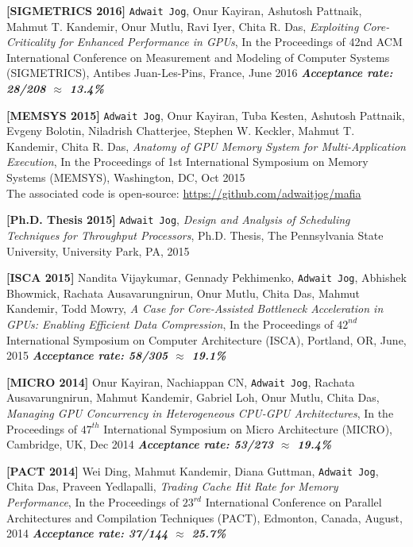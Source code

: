 \documentclass[10pt,a4]{article}
\begin{document}
\begin{description}
\item{\bf [SIGMETRICS 2016]} 
{\tt Adwait Jog}, Onur Kayiran, Ashutosh Pattnaik, Mahmut T. Kandemir, 
Onur Mutlu, Ravi Iyer, Chita R. Das, {\it Exploiting Core-Criticality for Enhanced Performance in GPUs}, 
In the Proceedings of 42nd ACM International Conference on Measurement and Modeling of Computer Systems (SIGMETRICS), Antibes Juan-Les-Pins, France, June 2016 
\textbf{\textit{Acceptance rate: 28/208 $\approx$ 13.4\%}}

\item 
{\bf [MEMSYS 2015]}
{\tt Adwait Jog}, Onur Kayiran, Tuba Kesten, Ashutosh Pattnaik, Evgeny Bolotin, Niladrish Chatterjee, 
Stephen W. Keckler, Mahmut T. Kandemir, Chita R. Das, 
{\it Anatomy of GPU Memory System for Multi-Application Execution}, 
In the Proceedings of 1st International Symposium on Memory Systems (MEMSYS), Washington, DC, Oct 2015 \\
The associated code is open-source: \url{https://github.com/adwaitjog/mafia}

\item 
{\bf [Ph.D. Thesis 2015]}
{\tt Adwait Jog}, {\it Design and Analysis of Scheduling Techniques for Throughput Processors}, 
Ph.D. Thesis, The Pennsylvania State University, University Park, PA, 2015

\item 
{\bf [ISCA 2015]}
Nandita Vijaykumar, Gennady Pekhimenko, {\tt Adwait Jog}, Abhishek Bhowmick, Rachata Ausavarungnirun, Onur Mutlu, Chita Das, Mahmut Kandemir, Todd Mowry,
{\it A Case for Core-Assisted Bottleneck Acceleration in GPUs: Enabling Efficient Data Compression},
In the Proceedings of $42^{nd}$ International Symposium on Computer Architecture (ISCA), Portland, OR, June, 2015
\textbf{\textit{Acceptance rate: 58/305 $\approx$ 19.1\%}}

\item{\bf [MICRO 2014]} 
Onur Kayiran, Nachiappan CN, {\tt Adwait Jog}, Rachata Ausavarungnirun, 
Mahmut Kandemir, Gabriel Loh, Onur Mutlu, Chita Das, 
{\it Managing GPU Concurrency in Heterogeneous CPU-GPU Architectures}, 
In the Proceedings of $47^{th}$ International Symposium on Micro Architecture (MICRO), Cambridge, UK, Dec 2014
\textbf{\textit{Acceptance rate: 53/273 $\approx$ 19.4\%}} 

\item{\bf [PACT 2014]}
Wei Ding, Mahmut Kandemir, Diana Guttman, {\tt Adwait Jog}, Chita Das, Praveen Yedlapalli, 
{\it Trading Cache Hit Rate for Memory Performance}, 
In the Proceedings of $23^{rd}$ International Conference on Parallel Architectures and Compilation Techniques (PACT), 
Edmonton, Canada, August, 2014 
\textbf{\textit{Acceptance rate: 37/144 $\approx$ 25.7\%}}


\end{description}
\end{document}
